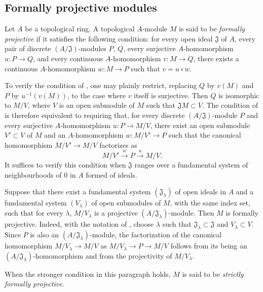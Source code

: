 \subsection{Formally projective modules}
\label{subsection:0.19.2}

\begin{definition}[19.2.1]
\label{0.19.2.1}
Let $A$ be a topological ring.
A topological $A$-module $M$ is said to be \emph{formally projective} if it satisfies the following condition:
for every open ideal $\mathfrak J$ of $A$, every pair of discrete $(A/\mathfrak J)$-modules $P$, $Q$, every surjective $A$-homomorphism $u:P\to Q$, and every continuous $A$-homomorphism $v:M\to Q$, there exists a continuous $A$-homomorphism $w:M\to P$ such that $v=u\circ w$.
\end{definition}

\begin{env}[19.2.2]
\label{0.19.2.2}
To verify the condition of , one may plainly restrict, replacing $Q$ by $v(M)$ and $P$ by $u^{-1}(v(M))$, to the case where $v$ itself is surjective.
Then $Q$ is isomorphic to $M/V$, where $V$ is an open submodule of $M$ such that $\mathfrak JM\subset V$.
The condition of  is therefore equivalent to requiring that, for every discrete $(A/\mathfrak J)$-module $P$ and every surjective $A$-homomorphism $u:P\to M/V$, there exist an open submodule $V'\subset V$ of $M$ and an $A$-homomorphism $w:M/V'\to P$ such that the canonical homomorphism $M/V'\to M/V$ factorizes as
\[
  M/V'\xrightarrow{w}P\xrightarrow{u}M/V.
\]
It suffices to verify this condition when $\mathfrak J$ ranges over a fundamental system of neighbourhoods of $0$ in $A$ formed of ideals.
\end{env}

\begin{env}[19.2.3]
\label{0.19.2.3}
Suppose that there exist a fundamental system $(\mathfrak J_\lambda)$ of open ideals in $A$ and a fundamental system $(V_\lambda)$ of open submodules of $M$, with the same index set, such that for every $\lambda$, $M/V_\lambda$ is a projective $(A/\mathfrak J_\lambda)$-module.
Then $M$ is formally projective.
Indeed, with the notation of , choose $\lambda$ such that $\mathfrak J_\lambda\subset\mathfrak J$ and $V_\lambda\subset V$.
Since $P$ is also an $(A/\mathfrak J_\lambda)$-module, the factorization of the canonical homomorphism $M/V_\lambda\to M/V$ as $M/V_\lambda\to P\to M/V$ follows from its being an $(A/\mathfrak J_\lambda)$-homomorphism and from the projectivity of $M/V_\lambda$.

When the stronger condition in this paragraph holds, $M$ is said to be \emph{strictly formally projective}.
\end{env}

